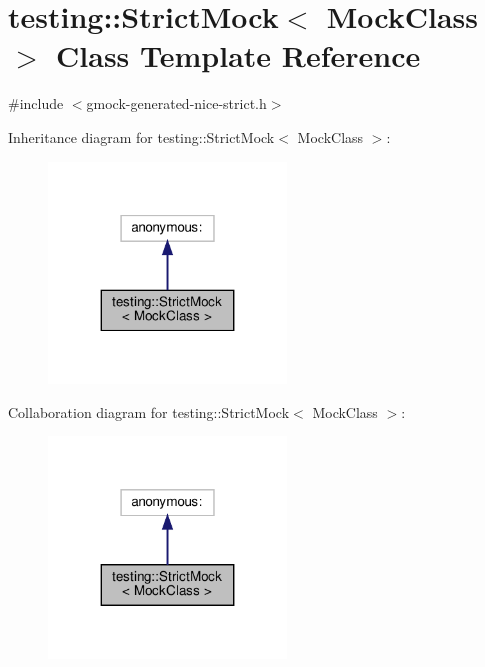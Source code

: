 \hypertarget{classtesting_1_1_strict_mock}{}\section{testing\+:\+:Strict\+Mock$<$ Mock\+Class $>$ Class Template Reference}
\label{classtesting_1_1_strict_mock}


{\ttfamily \#include $<$gmock-\/generated-\/nice-\/strict.\+h$>$}



Inheritance diagram for testing\+:\+:Strict\+Mock$<$ Mock\+Class $>$\+:
\nopagebreak
\begin{figure}[H]
\begin{center}
\leavevmode
\includegraphics[width=179pt]{classtesting_1_1_strict_mock__inherit__graph}
\end{center}
\end{figure}


Collaboration diagram for testing\+:\+:Strict\+Mock$<$ Mock\+Class $>$\+:
\nopagebreak
\begin{figure}[H]
\begin{center}
\leavevmode
\includegraphics[width=179pt]{classtesting_1_1_strict_mock__coll__graph}
\end{center}
\end{figure}
